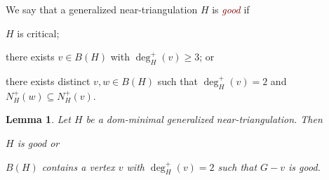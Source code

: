 \documentclass[12pt]{article}
\newtheorem{lem}{Lemma}
\newcommand{\defin}[1]{\emph{\textcolor{Maroon}{#1}}}
\begin{document}
We say that a generalized near-triangulation $H$ is \defin{good} if
\begin{compactenum}[(G1)]
      \item $H$ is critical;
      \item there exists $v\in B(H)$ with $\deg^+_H(v)\ge 3$; or
      \item there exists distinct $v,w\in B(H)$ such that $\deg^+_H(v)=2$ and $N^+_H(w)\subseteq N^+_H(v)$.
\end{compactenum}

\begin{lem}\label{not_good}
  Let $H$ be a dom-minimal generalized near-triangulation.  Then \begin{compactenum}[(i)]
    \item $H$ is good or
    \item $B(H)$ contains a vertex $v$ with $\deg^+_H(v)=2$ such that $G-v$ is good.
  \end{compactenum}
\end{lem}
\end{document}
